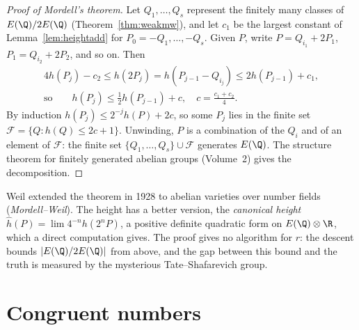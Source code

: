 \begin{proof}[Proof of Mordell's theorem]
Let $Q_1,\dots,Q_s$ represent the finitely many classes of $E(\Q)/2E(\Q)$ (Theorem~\ref{thm:weakmw}), and let $c_1$ be the largest constant of
Lemma~\ref{lem:heightadd} for $P_0=-Q_1,\dots,-Q_s$. Given $P$, write $P=Q_{i_1}+2P_1$, $P_1=Q_{i_2}+2P_2$, and so on. Then
\[
\begin{gathered}
4h(P_j)-c_2\le h(2P_j)=h(P_{j-1}-Q_{i_j})\le2h(P_{j-1})+c_1,\\
\text{so}\qquad h(P_j)\le\tfrac12h(P_{j-1})+c,\quad c=\tfrac{c_1+c_2}4.
\end{gathered}
\]
By induction $h(P_j)\le2^{-j}h(P)+2c$, so some $P_j$ lies in the finite set $\mathcal F=\{Q:h(Q)\le2c+1\}$. Unwinding, $P$ is a combination of the $Q_i$ and of an
element of $\mathcal F$: the finite set $\{Q_1,\dots,Q_s\}\cup\mathcal F$ generates $E(\Q)$. The structure theorem for finitely generated abelian groups
(Volume~2) gives the decomposition.
\end{proof}

\begin{remark}
Weil extended the theorem in 1928 to abelian varieties over number fields (\emph{Mordell--Weil}). The height has a better version, the \emph{canonical height}
$\hat h(P)=\lim4^{-n}h(2^nP)$, a positive definite quadratic form on $E(\Q)\otimes\R$, which a direct computation gives. The proof gives no algorithm for $r$: the
descent bounds $|E(\Q)/2E(\Q)|$ from above, and the gap between this bound and the truth is measured by the mysterious Tate--Shafarevich group.
\end{remark}

\section{Congruent numbers}

